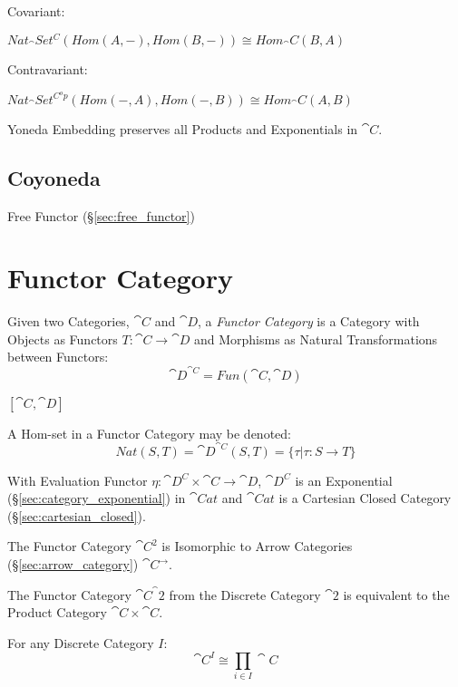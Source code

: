 Covariant:

$Nat_\cat{Set^C}(Hom(A,-), Hom(B,-)) \cong Hom_\cat{C}(B,A)$

Contravariant:

$Nat_\cat{Set^{C^op}}(Hom(-,A), Hom(-,B)) \cong Hom_\cat{C}(A,B)$

Yoneda Embedding preserves all Products and Exponentials in
$\cat{C}$.



\subsection{Coyoneda}\label{sec:coyoneda}

Free Functor (\S\ref{sec:free_functor})



\section{Functor Category}\label{sec:functor_category}

Given two Categories, $\cat{C}$ and $\cat{D}$, a \emph{Functor
  Category} is a Category with Objects as Functors $T : \cat{C}
\rightarrow \cat{D}$ and Morphisms as Natural Transformations
between Functors:
\[
  \cat{D}^{\cat{C}} = Fun(\cat{C},\cat{D})
\]

$[\cat{C},\cat{D}]$

A Hom-set in a Functor Category may be denoted:
\[
  Nat(S,T) = \cat{D}^{\cat{C}}(S,T) =
    \{ \tau | \tau : S \rightarrow T \}
\]

With Evaluation Functor $\eta : \cat{D^C} \times \cat{C} \rightarrow
\cat{D}$, $\cat{D^C}$ is an Exponential
(\S\ref{sec:category_exponential}) in $\cat{Cat}$ and $\cat{Cat}$ is a
Cartesian Closed Category (\S\ref{sec:cartesian_closed}).

The Functor Category $\cat{C^2}$ is Isomorphic to Arrow Categories
(\S\ref{sec:arrow_category}) $\cat{C}^\rightarrow$.

The Functor Category $\cat{C}^\cat{2}$ from the Discrete Category
$\cat{2}$ is equivalent to the Product Category $\cat{C} \times
\cat{C}$.

For any Discrete Category $I$:
\[
  \cat{C}^I \cong \prod_{i \in I} \cat{C}
\]

